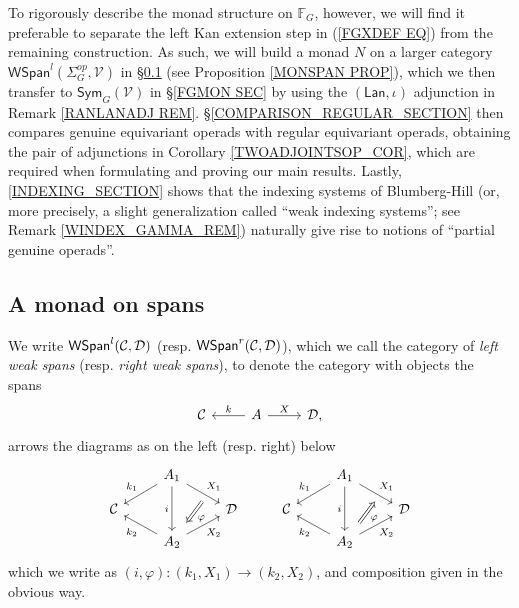 \documentclass[a4paper,10pt]{article}%
\begin{document}
To rigorously describe the monad structure on $\mathbb{F}_G$, however, we will find it preferable to separate the left Kan extension step in (\ref{FGXDEF EQ})
from the remaining construction.
As such, we will 
build a monad $N$ 
on a larger category
$\mathsf{WSpan}^l(\Sigma_G^{op},\mathcal{V})$
in \S \ref{MONSPAN SEC}
(see Proposition \ref{MONSPAN PROP}),
which we then transfer
to $\mathsf{Sym}_G(\mathcal{V})$
in \S \ref{FGMON SEC} 
by using the $(\mathsf{Lan},\iota)$ adjunction in Remark \ref{RANLANADJ REM}.
\S \ref{COMPARISON_REGULAR_SECTION} then compares genuine equivariant operads with regular equivariant operads, obtaining   the pair of adjunctions in Corollary \ref{TWOADJOINTSOP_COR}, which are required when formulating and proving our main results.
Lastly, \ref{INDEXING_SECTION} shows that the indexing systems of Blumberg-Hill (or, more precisely, a slight generalization called ``weak indexing systems''; see Remark \ref{WINDEX_GAMMA_REM}) naturally give rise to notions of ``partial genuine operads''.



\subsection{A monad on spans}\label{MONSPAN SEC}

\begin{definition}\label{WSPAN DEF}
We write 
$\mathsf{WSpan}^l(\mathcal{C},\mathcal{D})$
(resp.
$\mathsf{WSpan}^r(\mathcal{C},\mathcal{D})$),
which we call the category of  \textit{left weak spans} (resp. \textit{right weak spans}),
to denote the category with objects the spans
\[
\begin{tikzcd}
\C & A \ar{l}[swap]{k} \ar{r}{X} & \D,
\end{tikzcd}
\]
arrows the diagrams as on the left (resp. right) below 
\[
	\begin{tikzcd}[row sep=small]
	&
	A_1 \ar{dl}[swap,name=k1]{k_1} \ar{dr}[name=F11]{X_1} \ar{dd}[swap]{i} & &
	&
	A_1 \ar{dl}[swap,name=k1]{k_1} \ar{dr}[name=F1]{X_1} \ar{dd}[swap]{i} 
\\
	\C & & \D &
	\C & & \D 
\\
		& |[alias=G21]| A_2  \ar{ul}{k_2} \ar{ur}[swap]{X_2} & &
		& |[alias=G2]| A_2  \ar{ul}{k_2} \ar{ur}[swap]{X_2} &
		\arrow[Leftarrow, from=F1, to=G2,shorten >=0.25cm,shorten <=0.25cm,"\varphi"]
		\arrow[Rightarrow, from=F11, to=G21,shorten >=0.25cm,shorten <=0.25cm,"\varphi"]
	\end{tikzcd}
\]
which we write as $(i,\varphi) \colon (k_1,X_1) \to (k_2,X_2)$, and composition given in the obvious way.
\end{definition}
\end{document}

